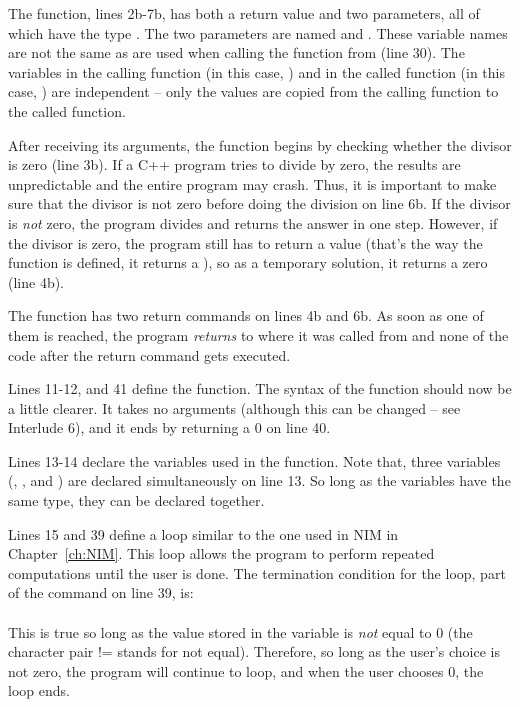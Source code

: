 The  function, lines 2b-7b, has both a return value and two parameters, all of which have the type .  The two parameters are named  and .  These variable names are not the same as are used when calling the function from  (line 30).  The variables in the calling function (in this case, ) and in the called function (in this case, ) are independent -- only the values are copied from the calling function to the called function. 

After receiving its arguments, the  function begins by checking whether the divisor is zero (line 3b).  If a C++ program tries to divide by zero, the results are unpredictable and the entire program may crash.  Thus, it is important to make sure that the divisor is not zero before doing the division on line 6b.  If the divisor is \emph{not} zero, the program divides and returns the answer in one step.  However, if the divisor is zero, the program still has to return a value (that's the way the function is defined, it returns a ), so as a temporary solution, it returns a zero (line 4b).

The  function has two return commands on lines 4b and 6b.  As soon as one of them is reached, the program \emph{returns} to where it was called from and none of the code after the return command gets executed.  


Lines 11-12, and 41 define the  function.  The syntax of the  function should now be a little clearer.  It takes no arguments (although this can be changed -- see Interlude 6), and it ends by returning a 0 on line 40.


Lines 13-14 declare the variables used in the  function.  Note that, three variables (, , and ) are declared simultaneously on line 13.  So long as the variables have the same type, they can be declared together.  


Lines 15 and 39 define a  loop similar to the one used in NIM in Chapter~\ref{ch:NIM}.  This loop allows the program to perform repeated computations until the user is done.  The termination condition for the loop, part of the  command on line 39, is:\\
\\
This is true so long as the value stored in the variable  is \emph{not} equal to 0 (the character pair != stands for not equal).  Therefore, so long as the user's choice is not zero, the program will continue to loop, and when the user chooses 0, the loop ends.

